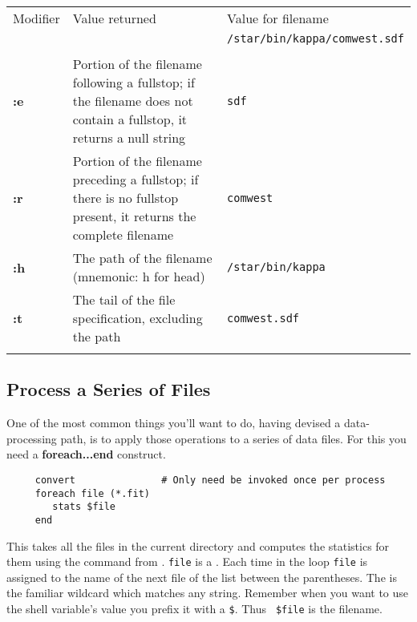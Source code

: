 \begin{center}
\begin{tabular}{lp{62mm}l}
Modifier & Value returned & Value for filename \\
 & & {\tt /star/bin/kappa/comwest.sdf} \\ \hline
\\
{\bf :e} & Portion of the filename following a fullstop; if the filename does
not contain a fullstop, it returns a null string & {\tt sdf} \\
{\bf :r} & Portion of the filename preceding a fullstop; if there is no fullstop
present, it returns the complete filename & {\tt comwest} \\
{\bf :h} & The path of the filename (mnemonic: h for head) & {\tt /star/bin/kappa} \\
{\bf :t} & The tail of the file specification, excluding the path &
                                         {\tt comwest.sdf} \\ 
\\ \hline
\end{tabular}
\end{center}
\medskip

\newpage
\subsection{Process a Series of Files
\label{sc4_se_series_files}}

One of the most common things you'll want to do, having devised
a data-processing path, is to apply those operations to a series
of data files.   For this you need a {\bf foreach...end} construct.

\small
\begin{verbatim}
     convert               # Only need be invoked once per process
     foreach file (*.fit)
        stats $file
     end
\end{verbatim}
\normalsize
This takes all the  files in the
current directory and computes the statistics for them using the
 command from \KAPPAref\@.  {\tt file}
is a .  Each time in the
loop {\tt file} is assigned to the name of the next file of the list
between the parentheses.  The {\tt *} is the familiar wildcard which
matches any string.  Remember when you want to use the shell
variable's value you prefix it with a {\tt \$}.  Thus {\tt
\$file} is the filename.

